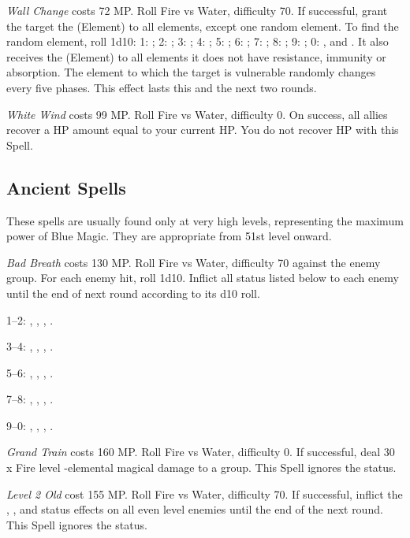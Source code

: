 \begin{multicols}{2}
	\textit{Wall Change} costs 72 MP\@. Roll Fire vs Water, difficulty 70. If successful, grant the target the (Element)  to all elements, except one random element. To find the random element, roll 1d10: 1: ; 2: ; 3: ; 4: ; 5: ; 6: ; 7: ; 8: ; 9: ; 0: ,  and . It also receives the (Element)  to all elements it does not have resistance, immunity or absorption. The element to which the target is vulnerable randomly changes every five phases. This effect lasts this and the next two rounds.
    
    \textit{White Wind} costs 99 MP\@. Roll Fire vs Water, difficulty 0. On success, all allies recover a HP amount equal to your current HP\@. You do not recover HP with this Spell.

\subsection{Ancient Spells}\label{subsec:blue-ancient}

	These spells are usually found only at very high levels, representing the maximum power of Blue Magic. They are appropriate from 51st level onward.
    
    \textit{Bad Breath} costs 130 MP\@. Roll Fire vs Water, difficulty 70 against the enemy group. For each enemy hit, roll 1d10. Inflict all status listed below to each enemy until the end of next round according to its d10 roll.

1--2: , , , .

3--4: , , , .

5--6: , , , .

7--8: , , , .

9--0: , , , .

    \textit{Grand Train} costs 160 MP\@. Roll Fire vs Water, difficulty 0. If successful, deal 30 x Fire level -elemental magical damage to a group. This Spell ignores the  status.
    
    \textit{Level 2 Old} cost 155 MP\@. Roll Fire vs Water, difficulty 70. If successful, inflict the , ,  and  status effects on all even level enemies until the end of the next round. This Spell ignores the  status.
    

\end{multicols}
